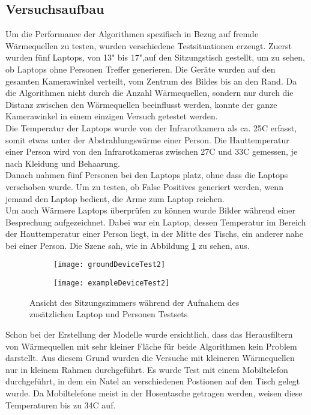 \subsection{Versuchsaufbau}

Um die Performance der Algorithmen spezifisch in Bezug auf fremde Wärmequellen zu testen, wurden verschiedene Testsituationen erzeugt. Zuerst wurden fünf Laptops, von 13" bis 17",auf den Sitzungstisch gestellt, um zu sehen, ob Laptops ohne Personen Treffer generieren. Die Geräte wurden auf den gesamten Kamerawinkel verteilt, vom Zentrum des Bildes bis an den Rand. Da die Algorithmen nicht durch die Anzahl Wärmequellen, sondern nur durch die Distanz zwischen den Wärmequellen beeinflusst werden, konnte der ganze Kamerawinkel in einem einzigen Versuch getestet werden.\\
Die Temperatur der Laptops wurde von der Infrarotkamera als ca. 25\degree C erfasst, somit etwas unter der Abstrahlungswärme einer Person. Die Hauttemperatur einer Person wird von den Infrarotkameras zwischen 27\degree C und 33\degree C gemessen, je nach Kleidung und Behaarung.\\
Danach nahmen fünf Personen bei den Laptops platz,  ohne dass die Laptops verschoben wurde. Um zu testen, ob False Positives generiert werden, wenn jemand den Laptop bedient, die Arme zum Laptop reichen.\\
Um auch Wärmere Laptops überprüfen zu können wurde Bilder während einer Besprechung aufgezeichnet. Dabei war ein Laptop, dessen Temperatur im Bereich der Hauttemperatur einer Person liegt, in der Mitte des Tischs, ein anderer nahe bei einer Person. Die Szene sah, wie in Abbildung \ref{fig:exampleDeviceTest2} zu sehen, aus.
\\
\begin{figure}[htb]
	\centering
	\begin{subfigure}{.45\linewidth}
		\centering
		\texttt{[image: groundDeviceTest2]}
	\end{subfigure}
	\begin{subfigure}{.45\linewidth}
		\centering
		\texttt{[image: exampleDeviceTest2]}
	\end{subfigure}
	\caption{Ansicht des Sitzungszimmers während der Aufnahem des zusätzlichen Laptop und Personen Testsets}
	\label{fig:exampleDeviceTest2}
\end{figure}
Schon bei der Erstellung der Modelle wurde ersichtlich, dass das Herausfiltern von Wärmequellen mit sehr kleiner Fläche für beide Algorithmen kein Problem darstellt. Aus diesem Grund wurden die Versuche mit kleineren Wärmequellen nur in kleinem Rahmen durchgeführt. Es wurde Test mit einem Mobiltelefon durchgeführt, in dem ein Natel an verschiedenen Postionen auf den Tisch gelegt wurde. Da Mobiltelefone meist in der Hosentasche getragen werden, weisen diese Temperaturen bis zu 34\degree C auf.\\
\\

